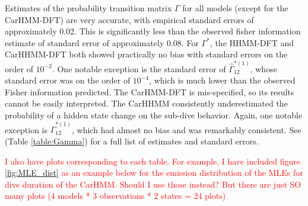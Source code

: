 
Estimates of the probability transition matrix $\Gamma$ for all models (except for the CarHMM-DFT) are very accurate, with empirical standard errors of approximately 0.02. This is significantly less than the observed fisher information estimate of standard error of approximately 0.08.
For $\Gamma^*$, the HHMM-DFT and CarHHMM-DFT both showed practically no bias with standard errors on the order of $10^{-2}$. One notable exception is the standard error of $\hat \Gamma^{*(1)}_{12}$, whose standard error was on the order of $10^{-4}$, which is much lower than the observed Fisher information predicted. The CarHMM-DFT is mis-specified, so its results cannot be easily interpreted. The CarHHMM consistently underestimated the probability of a hidden state change on the sub-dive behavior. Again, one notable exception is $\hat \Gamma^{*(1)}_{12}$, which had almost no bias and was remarkably consistent. See (Table \ref{table:Gamma}) for a full list of estimates and standard errors.

\textcolor{red}{I also have plots corresponding to each table. For example, I have included figure \ref{fig:MLE_dist} as an example below for the emission distribution of the MLEs for dive duration of the CarHMM. Should I use those instead? But there are just SO many plots (4 models * 3 observations * 2 states = 24 plots)}